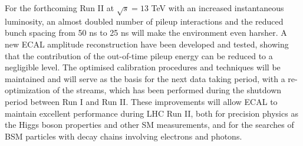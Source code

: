 \documentclass[journal]{IEEEtran}
\begin{document}
For the forthcoming Run II at $\sqrt{s}=13$ TeV with an increased instantaneous luminosity, an almost doubled number of pileup interactions and the reduced bunch spacing from 50 ns to 25 ns will make the environment even harsher. A new ECAL amplitude reconstruction have been developed and tested, showing that the contribution of the out-of-time pileup energy can be reduced to a negligible level. The optimised calibration procedures and techniques will be maintained and will serve as the basis for the next data taking period, with a re-optimization of the streams, which has been performed during the shutdown period between Run I and Run II. These improvements will allow ECAL to maintain excellent performance during LHC Run II, both for precision physics as the Higgs boson properties and other SM measurements, and for the searches of BSM particles with decay chains involving electrons and photons.


\ifCLASSOPTIONcaptionsoff
  \newpage
\fi
\end{document}

